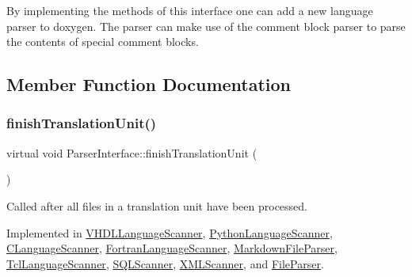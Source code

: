 By implementing the methods of this interface one can add a new language parser to doxygen. The parser can make use of the comment block parser to parse the contents of special comment blocks. 

\subsection{Member Function Documentation}
\mbox{\label{class_parser_interface_af3acd64c6a33852e2e46e7288eb9c9cf}} 
\subsubsection{\texorpdfstring{finishTranslationUnit()}{finishTranslationUnit()}}
{\footnotesize\ttfamily virtual void Parser\+Interface\+::finish\+Translation\+Unit (\begin{DoxyParamCaption}{ }\end{DoxyParamCaption})\hspace{0.3cm}{\ttfamily [pure virtual]}}

Called after all files in a translation unit have been processed. 

Implemented in \mbox{\hyperlink{class_v_h_d_l_language_scanner_a1c08cc94a1cd79fdaf8a102935089445}{V\+H\+D\+L\+Language\+Scanner}}, \mbox{\hyperlink{class_python_language_scanner_a97ca623055615c143e63ea98be819f86}{Python\+Language\+Scanner}}, \mbox{\hyperlink{class_c_language_scanner_a03f5004bda27f5c73f3b9d74d9064b99}{C\+Language\+Scanner}}, \mbox{\hyperlink{class_fortran_language_scanner_abf5a872f1e3bd81f5a285e9586869def}{Fortran\+Language\+Scanner}}, \mbox{\hyperlink{class_markdown_file_parser_adaf4aeedc27abe4dd8cc4a58d59b298f}{Markdown\+File\+Parser}}, \mbox{\hyperlink{class_tcl_language_scanner_a187804b0bf0a0043bad0f1a752224909}{Tcl\+Language\+Scanner}}, \mbox{\hyperlink{class_s_q_l_scanner_a523d522ed6726915191b5a5ae9584c92}{S\+Q\+L\+Scanner}}, \mbox{\hyperlink{class_x_m_l_scanner_a00b3082e888d6bd670fdc31e52b79606}{X\+M\+L\+Scanner}}, and \mbox{\hyperlink{class_file_parser_a08ab809441600d2ace9508c040bc3943}{File\+Parser}}.

\mbox{\label{class_parser_interface_a36c669b17b64a6e3847f27d70a5398d2}} 
